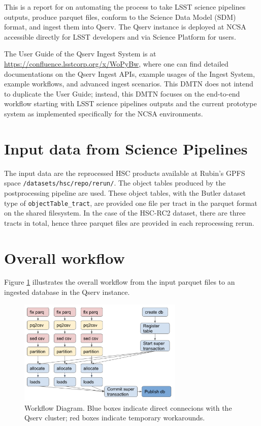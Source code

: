 This is a report for  on automating the process to take LSST science pipelines outputs, produce parquet files, conform to the Science Data Model (SDM) format, and ingest them into Qserv.
The Qserv instance is deployed at NCSA accessible directly for LSST developers and via Science Platform for users.

The User Guide of the Qserv Ingest System is at \url{https://confluence.lsstcorp.org/x/WoPyBw}, where one can find detailed documentations on the Qserv Ingest APIs, example usages of the Ingest System, example workflows, and advanced ingest scenarios.
This DMTN does not intend to duplicate the User Guide; instead, this DMTN focuses on the end-to-end workflow starting with LSST science pipelines outputs and the current prototype system as implemented specifically for the NCSA environments.

\section{Input data from Science Pipelines}
The input data are the reprocessed HSC products available at Rubin's GPFS space \texttt{/datasets/hsc/repo/rerun/}.
The object tables produced by the postprocessing pipeline are used.
These object tables, with the Butler dataset type of \texttt{objectTable\_tract}, are provided one file per tract in the parquet format on the shared filesystem.
In the case of the HSC-RC2 dataset, there are three tracts in total, hence three parquet files are provided in each reprocessing rerun.


\section{Overall workflow}
Figure \ref{fig:workflow} illustrates the overall workflow from the input parquet files to an ingested database in the Qserv instance.

\begin{figure}[h]
  \centering
  \includegraphics[width=0.70\textwidth]{ingest_workflow_DM27383.png}
  \caption{Workflow Diagram. Blue boxes indicate direct connecions with the Qserv cluster; red boxes indicate temporary workarounds.}
  \label{fig:workflow}
\end{figure}

